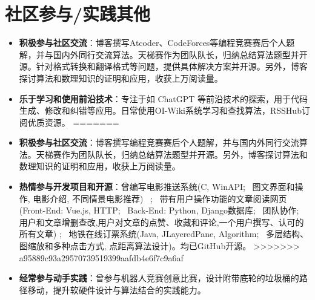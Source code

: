 \documentclass{resume}
\begin{document}


\section{社区参与/实践其他}
\begin{itemize}[parsep=0.2ex]
<<<<<<< HEAD
  \item \textbf{积极参与社区交流}：博客撰写Atcoder、CodeForces等编程竞赛赛后个人题解，并与国内外同行交流算法。天梯赛作为团队队长，归纳总结算法题型并开源。针对格式转换和翻译格式等问题，提供具体解决方案并开源。另外，博客探讨算法和数理知识的证明和应用，收获上万阅读量。
  \item \textbf{乐于学习和使用前沿技术}：专注于如 ChatGPT 等前沿技术的探索，用于代码生成、修改和纠错等应用。日常使用OI-Wiki系统学习和查找算法，RSSHub订阅优质资源。
=======
  \item \textbf{积极参与社区交流}：博客撰写编程竞赛赛后个人题解，并与国内外同行交流算法。天梯赛作为团队队长，归纳总结算法题型并开源。另外，博客探讨算法和数理知识的证明和应用，收获上万阅读量。
  \item \textbf{热情参与开发项目和开源}：曾编写电影推送系统(C, WinAPI; \, 图文界面和操作, 电影介绍, 不同情景电影推荐) \, ; \, 带有用户操作功能的文章阅读网页(Front-End: Vue.js, HTTP; \, Back-End: Python, Django数据库; \, 团队协作; \, 用户和文章增删查改,用户对文章的点赞、收藏和评论,一个用户撰写、认可的所有文章) ; \, 地铁在线订票系统(Java, JLayeredPane, Algorithm; \, 多层结构、图缩放和多种点击方式, 点距离算法设计)。均已GitHub开源。
>>>>>>> a95889c93a29570739519399aafdb4e6f7c9a6af
  \item \textbf{经常参与动手实践}：曾参与机器人竞赛创意比赛，设计附带底轮的垃圾桶的路径移动，提升软硬件设计与算法结合的实践能力。
  
\end{itemize}

%
%
\end{document}
